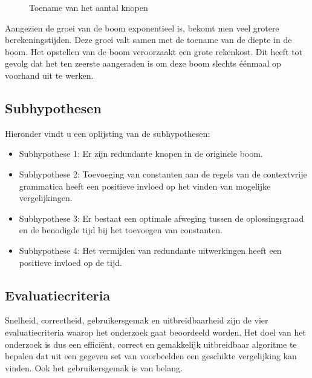 \documentclass[Main.tex]{subfiles}
\begin{document}
\begin{figure}[!htb]
\centering
{}
\caption{Toename van het aantal knopen}
\label{fig:treeSize}
\end{figure}


Aangezien de groei van de boom exponentieel is, bekomt men veel grotere berekeningstijden. Deze groei valt samen met de toename van de diepte in de boom. Het opstellen van de boom veroorzaakt een grote rekenkost. Dit heeft tot gevolg dat het ten zeerste aangeraden is om deze boom slechts \'e\'enmaal op voorhand uit te werken.

\subsection{Subhypothesen} \label{ssec:subhypothesen}
\par Hieronder vindt u een oplijsting van de subhypothesen:

\begin{itemize}
\item Subhypothese 1: Er zijn redundante knopen in de originele boom.
\item Subhypothese 2: Toevoeging van constanten aan de regels van de contextvrije grammatica heeft een positieve invloed op het vinden van mogelijke vergelijkingen.
\item Subhypothese 3: Er bestaat een optimale afweging tussen de oplossingsgraad en de benodigde tijd bij het toevoegen van constanten.
\item Subhypothese 4: Het vermijden van redundante uitwerkingen heeft een positieve invloed op de tijd. 
\end{itemize}

\subsection{Evaluatiecriteria}

Snelheid, correctheid, gebruikersgemak en uitbreidbaarheid zijn de vier evaluatiecriteria waarop het onderzoek gaat beoordeeld worden. Het doel van het onderzoek is dus een effici\"ent, correct en gemakkelijk uitbreidbaar algoritme te bepalen dat uit een gegeven set van voorbeelden een geschikte vergelijking kan vinden. Ook het gebruikersgemak is van belang.
\end{document}
